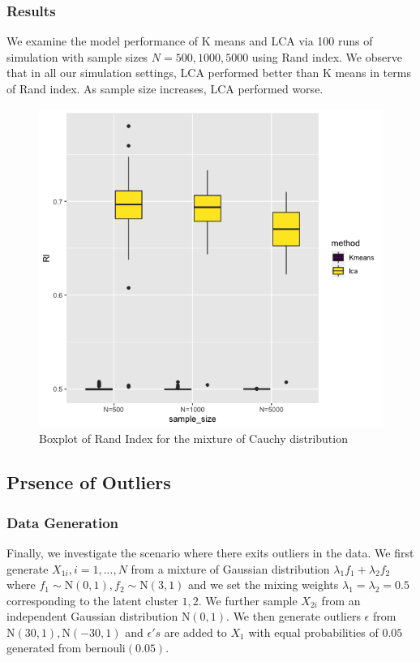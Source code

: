 \documentclass[
]{article}
\begin{document}
\hypertarget{results-2}{%
\subsubsection{Results}\label{results-2}}

We examine the model performance of K means and LCA via 100 runs of
simulation with sample sizes \(N = 500, 1000, 5000\) using Rand index.
We observe that in all our simulation settings, LCA performed better
than K means in terms of Rand index. As sample size increases, LCA
performed worse.

\begin{figure}

{\centering \includegraphics[width=0.5\linewidth]{report_image/RI_cauchy} 

}

\caption{Boxplot of Rand Index for the mixture of Cauchy distribution }\label{fig:unnamed-chunk-3}
\end{figure}

\hypertarget{prsence-of-outliers}{%
\subsection{Prsence of Outliers}\label{prsence-of-outliers}}

\hypertarget{data-generation-3}{%
\subsubsection{Data Generation}\label{data-generation-3}}

Finally, we investigate the scenario where there exits outliers in the
data. We first generate \(X_{1i}, i = 1,...,N\) from a mixture of
Gaussian distribution \(\lambda_1f_1 + \lambda_2f_2\) where
\(f_1 \sim \text{N}(0,1), f_2 \sim \text{N}(3,1)\) and we set the mixing
weights \(\lambda_1 = \lambda_2 = 0.5\) corresponding to the latent
cluster \(1,2\). We further sample \(X_{2i}\) from an independent
Gaussian distribution \(\text{N}(0,1)\). We then generate outliers
\(\epsilon\) from \(\text{N}(30,1), \text{N}(-30,1)\) and \(\epsilon's\)
are added to \(X_1\) with equal probabilities of \(0.05\) generated from
\(\text{bernouli}(0.05)\).
\end{document}
